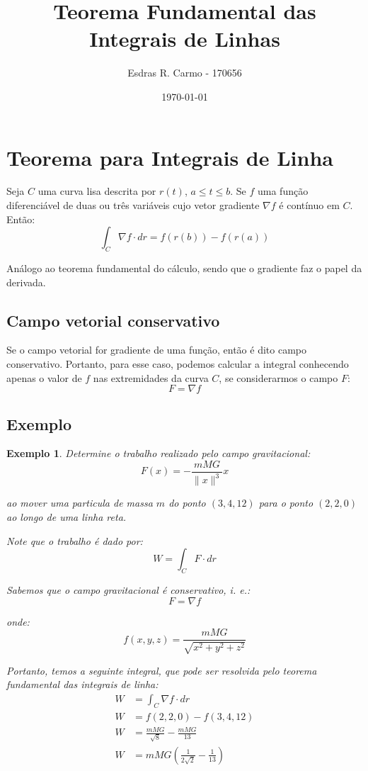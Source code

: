 \documentclass{article}
\author{Esdras R. Carmo - 170656}
\title{Teorema Fundamental das Integrais de Linhas}
\date{\today}
\newcommand{\norm}[1] {\left.\parallel #1 \right.\parallel}
\newtheorem{example}{Exemplo}[section]
\begin{document}
    \maketitle

    \section{Teorema para Integrais de Linha}
        Seja $C$ uma curva lisa descrita por $r(t)$, $a \leq t \leq b$. Se $f$ uma função
        diferenciável de duas ou três variáveis cujo vetor gradiente $\nabla f$ é contínuo em
        $C$. Então:
        \[
            \int_C \nabla f \cdot dr = f(r(b)) - f(r(a))
        \]

        Análogo ao teorema fundamental do cálculo, sendo que o gradiente faz o papel da derivada.

        \subsection{Campo vetorial conservativo}
            Se o campo vetorial for gradiente de uma função, então é dito campo conservativo. Portanto,
            para esse caso, podemos calcular a integral conhecendo apenas o valor de $f$ nas extremidades
            da curva $C$, se considerarmos o campo $F$:
            \[
                F = \nabla f
            \]

        \subsection{Exemplo}
            \begin{example}
                Determine o trabalho realizado pelo campo gravitacional:
                \[
                    F(x) = - \frac{mMG}{\norm{x}^3} x
                \]

                ao mover uma particula de massa $m$ do ponto $(3, 4, 12)$ para o ponto $(2, 2, 0)$ ao longo
                de uma linha reta.

                Note que o trabalho é dado por:
                \[
                    W = \int_C F \cdot dr
                \]

                Sabemos que o campo gravitacional é conservativo, i. e.:
                \[
                    F = \nabla f
                \]

                onde:
                \[
                    f(x, y, z) = \frac{mMG}{\sqrt{x^2 + y^2 + z^2}}
                \]

                Portanto, temos a seguinte integral, que pode ser resolvida pelo teorema fundamental das integrais de linha:
                \begin{align*}
                    W &= \int_C \nabla f \cdot dr\\
                    W &= f(2, 2, 0) - f(3, 4, 12)\\
                    W &= \frac{mMG}{\sqrt{8}} - \frac{mMG}{13}\\
                    W &= mMG \left(\frac{1}{2\sqrt{2}} - \frac{1}{13}\right)
                \end{align*}
            \end{example}
\end{document}
